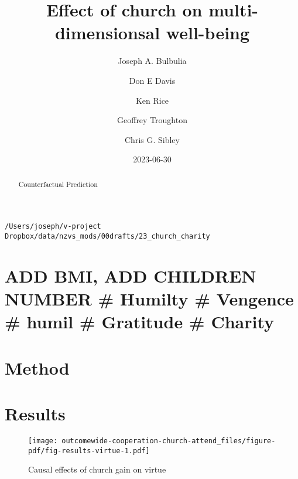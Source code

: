 \documentclass[
  singlecolumn]{report}
\title{Effect of church on multi-dimensionsal well-being}
\author{Joseph A. Bulbulia \and Don E Davis \and Ken Rice \and Geoffrey
Troughton \and Chris G. Sibley}
\date{2023-06-30}
\begin{document}
\maketitle
\begin{abstract}
Counterfactual Prediction
\end{abstract}
\ifdefined\Shaded\renewenvironment{Shaded}{\begin{tcolorbox}[breakable, frame hidden, boxrule=0pt, interior hidden, borderline west={3pt}{0pt}{shadecolor}, enhanced, sharp corners]}{\end{tcolorbox}}\fi

\listoffigures
\listoftables
\begin{verbatim}
/Users/joseph/v-project Dropbox/data/nzvs_mods/00drafts/23_church_charity
\end{verbatim}

\hypertarget{add-bmi-add-children-number-humilty-vengence-humil-gratitude-charity}{%
\section{ADD BMI, ADD CHILDREN NUMBER \# Humilty \# Vengence \# humil \#
Gratitude \#
Charity}\label{add-bmi-add-children-number-humilty-vengence-humil-gratitude-charity}}

\hypertarget{method}{%
\section{Method}\label{method}}

\hypertarget{results}{%
\section{Results}\label{results}}

\begin{figure}

{\centering \texttt{[image: outcomewide-cooperation-church-attend\_files/figure-pdf/fig-results-virtue-1.pdf]}

}

\caption{\label{fig-results-virtue}Causal effects of church gain on
virtue}

\end{figure}
\end{document}
